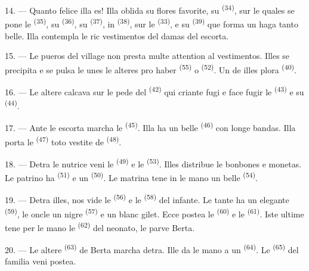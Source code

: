 14. --- Quanto felice illa es! Illa oblida su flores favorite, su
 \textsuperscript{(34)}, sur le quales se pone le
 \textsuperscript{(35)}, su 
\textsuperscript{(36)}, su  \textsuperscript{(37)}, in
 \textsuperscript{(38)}, sur le 
\textsuperscript{(33)}, e su  \textsuperscript{(39)} que forma un
haga tanto belle. Illa contempla le ric vestimentos del damas del escorta.

15. --- Le pueros del village non presta multe attention al vestimentos. Illes
se precipita e se pulsa le unes le alteres pro haber 
\textsuperscript{(55)} o  \textsuperscript{(52)}. Un de illes
plora \textsuperscript{(40)}.

16. --- Le altere calcava sur le pede del  \textsuperscript{(42)}
qui criante fugi e face fugir le  \textsuperscript{(43)} e su
 \textsuperscript{(44)}.

\VUsaut{5.0mm}
\VUsaut{4.0mm}

17. --- Ante le escorta marcha le  \textsuperscript{(45)}. Illa
ha un belle  \textsuperscript{(46)} con longe bandas. Illa porta
le  \textsuperscript{(47)} toto vestite de 
\textsuperscript{(48)}.

18. --- Detra le nutrice veni le  \textsuperscript{(49)} e le
 \textsuperscript{(53)}. Illes distribue le bonbones e monetas.
Le patrino ha  \textsuperscript{(51)} e un  \textsuperscript{(50)}. Le matrina tene in le mano un belle
 \textsuperscript{(54)}.

19. --- Detra illes, nos vide le  \textsuperscript{(56)} e le
 \textsuperscript{(58)} del infante. Le tante ha un elegante
 \textsuperscript{(59)}, le oncle un nigre 
\textsuperscript{(57)} e un blanc gilet. Ecce postea le 
\textsuperscript{(60)} e le  \textsuperscript{(61)}. Iste ultime
tene per le mano le  \textsuperscript{(62)} del neonato, le parve
Berta.

20. --- Le altere  \textsuperscript{(63)} de Berta marcha detra.
Ille da le mano a un  \textsuperscript{(64)}. Le 
\textsuperscript{(65)} del familia veni postea.

